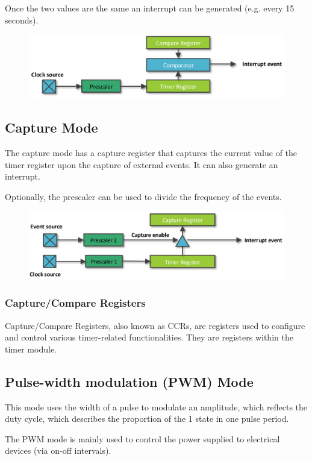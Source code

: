 Once the two values are the same an interrupt can be generated (e.g. every 15 seconds).


\begin{figure}[H]
    \centering
    \includegraphics[width=0.75\linewidth]{img/image65.png}
\end{figure}

\subsection{Capture Mode}
The capture mode has a capture register that captures the current value of the timer register upon the
capture of external events. It can also generate an interrupt.

Optionally, the prescaler can be used to divide the frequency of the events.


\begin{figure}[H]
    \centering
    \includegraphics[width=0.75\linewidth]{img/image66.png}
\end{figure}

\subsubsection{Capture/Compare Registers}
Capture/Compare Registers, also known as CCRs, are registers used to configure and control various
timer-related functionalities. They are registers within the timer module.


\subsection{Pulse-width modulation (PWM) Mode}

This mode uses the width of a pulse to modulate an amplitude, which reflects the duty cycle, which
describes the proportion of the 1 state in one pulse period.

The PWM mode is mainly used to control the power supplied to electrical devices (via on-off intervals).

